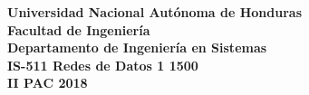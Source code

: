 \begin{center}
\bfseries{Universidad Nacional Autónoma de Honduras}\\
Facultad de Ingeniería\\
Departamento de Ingeniería en Sistemas\\
\bigskip
\bigskip
IS-511 Redes de Datos 1 1500\\
II PAC 2018
\end{center}
